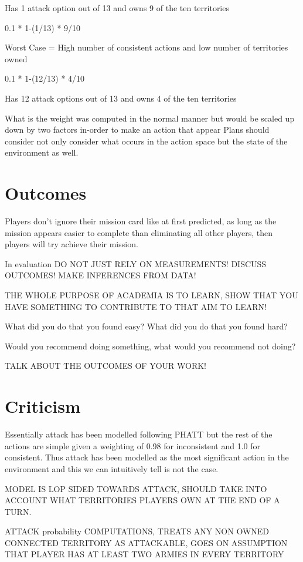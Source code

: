 \documentclass[parskip]{cs4rep}
\begin{document}
Has 1 attack option out of 13 and owns 9 of the ten territories

0.1 * 1-(1/13) * 9/10 

Worst Case = High number of consistent actions and low number of territories owned

0.1 * 1-(12/13) * 4/10 

Has 12 attack options out of 13 and owns 4 of the ten territories

What is the weight was computed in the normal manner but would be scaled up down by two factors in-order to make an action that appear
Plans should consider not only consider what occurs in the action space but the state of the environment as well.

\section{Outcomes}

Players don't ignore their mission card like at first predicted, as long as the mission appears easier to complete than eliminating all other players, then players will try achieve their mission.

In evaluation DO NOT JUST RELY ON MEASUREMENTS! DISCUSS OUTCOMES! MAKE INFERENCES FROM DATA!

THE WHOLE PURPOSE OF ACADEMIA IS TO LEARN, SHOW THAT YOU HAVE SOMETHING TO CONTRIBUTE TO THAT AIM TO LEARN!

What did you do that you found easy? What did you do that you found hard? 

Would you recommend doing something, what would you recommend not doing?

TALK ABOUT THE OUTCOMES OF YOUR WORK!

\section{Criticism}

Essentially attack has been modelled following PHATT but the rest of the actions are simple given a weighting of 0.98 for inconsistent and 1.0 for consistent. Thus attack has been modelled as the most significant action in the environment and this we can intuitively tell is not the case.

MODEL IS LOP SIDED TOWARDS ATTACK, SHOULD TAKE INTO ACCOUNT WHAT TERRITORIES PLAYERS OWN AT THE END OF A TURN.

ATTACK probability COMPUTATIONS, TREATS ANY NON OWNED CONNECTED TERRITORY AS ATTACKABLE, GOES ON ASSUMPTION THAT PLAYER HAS AT LEAST TWO ARMIES IN EVERY TERRITORY
\end{document}
